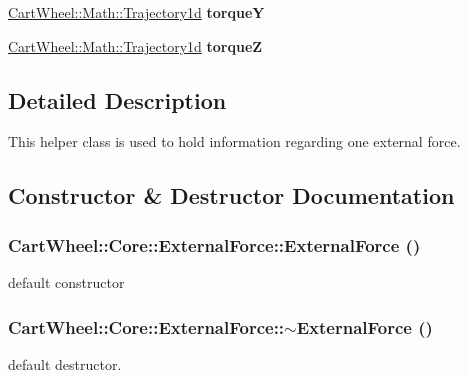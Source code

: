 \begin{DoxyCompactItemize}
\item 
\hypertarget{classCartWheel_1_1Core_1_1ExternalForce_ae3aa798e93530fce4abe81fb8af54104}{
\hyperlink{classCartWheel_1_1Math_1_1GenericTrajectory}{CartWheel::Math::Trajectory1d} {\bfseries torqueY}}
\label{classCartWheel_1_1Core_1_1ExternalForce_ae3aa798e93530fce4abe81fb8af54104}

\item 
\hypertarget{classCartWheel_1_1Core_1_1ExternalForce_a980007868602a8b04e592858c300ad89}{
\hyperlink{classCartWheel_1_1Math_1_1GenericTrajectory}{CartWheel::Math::Trajectory1d} {\bfseries torqueZ}}
\label{classCartWheel_1_1Core_1_1ExternalForce_a980007868602a8b04e592858c300ad89}

\end{DoxyCompactItemize}


\subsection{Detailed Description}
This helper class is used to hold information regarding one external force. 

\subsection{Constructor \& Destructor Documentation}
\hypertarget{classCartWheel_1_1Core_1_1ExternalForce_adad77fb363ad116e25f437e50814a629}{
\subsubsection[{ExternalForce}]{\setlength{\rightskip}{0pt plus 5cm}CartWheel::Core::ExternalForce::ExternalForce ()}}
\label{classCartWheel_1_1Core_1_1ExternalForce_adad77fb363ad116e25f437e50814a629}
default constructor \hypertarget{classCartWheel_1_1Core_1_1ExternalForce_aebf14a4be55915ed564429a359a2b9d1}{
\subsubsection[{$\sim$ExternalForce}]{\setlength{\rightskip}{0pt plus 5cm}CartWheel::Core::ExternalForce::$\sim$ExternalForce ()}}
\label{classCartWheel_1_1Core_1_1ExternalForce_aebf14a4be55915ed564429a359a2b9d1}
default destructor. 

